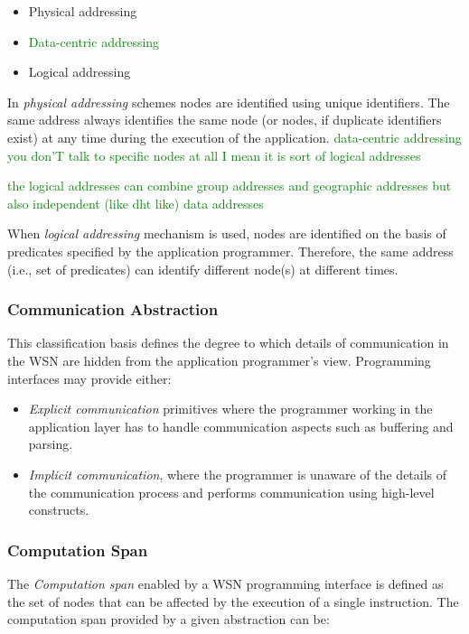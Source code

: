 \begin{itemize}
  \item Physical addressing
  \item \textcolor{green}{Data-centric addressing}
  \item Logical addressing
\end{itemize}

In \emph{physical addressing} schemes nodes are identified using unique 
  identifiers. The same address always identifies the same node (or nodes, if
  duplicate  identifiers exist) at any time during the execution of the
  application.
\textcolor{green}{data-centric addressing you don'T talk to specific nodes at all I mean it is sort of logical addresses} 

\textcolor{green}{the logical addresses can combine group addresses and geographic addresses but also independent (like dht like) data addresses }

When \emph{logical addressing} mechanism is used, nodes are identified on the
basis of predicates specified by the application programmer. Therefore, the same
  address (i.e., set of predicates) can identify different node(s) at different
  times.

\subsubsection{Communication Abstraction}

This classification basis defines the degree to which details of communication
in the WSN are hidden from the application programmer's view. Programming
interfaces may provide either:

\begin{itemize}
  \item \emph{Explicit communication} primitives where the
  programmer working in the application layer has to handle communication
  aspects such as buffering and parsing.
  \item \emph{Implicit communication}, where the programmer is unaware of the
  details of the communication process and performs communication using
  high-level constructs.
\end{itemize}

\subsubsection{Computation Span}

The \emph{Computation span} enabled by a WSN programming interface is defined
as the set of nodes that can be affected by the execution of a single
instruction. The
computation span provided by a given abstraction can be:

